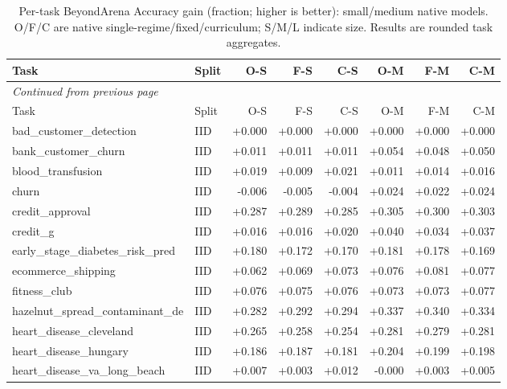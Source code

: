 \begin{longtable}{@{}p{3.95cm}lrrrrrr@{}}
\caption{Per-task BeyondArena Accuracy gain (fraction; higher is better): small/medium native models. O/F/C are native single-regime/fixed/curriculum; S/M/L indicate size. Results are rounded task aggregates.}\label{tab:accsm}\\
\toprule Task & Split & O-S & F-S & C-S & O-M & F-M & C-M\\\midrule
\endfirsthead
\multicolumn{8}{l}{\emph{Continued from previous page}}\\\toprule
Task & Split & O-S & F-S & C-S & O-M & F-M & C-M\\\midrule\endhead
\bottomrule\endfoot
bad\_\allowbreak{}customer\_\allowbreak{}detection & IID & +0.000 & +0.000 & +0.000 & +0.000 & +0.000 & +0.000\\
bank\_\allowbreak{}customer\_\allowbreak{}churn & IID & +0.011 & +0.011 & +0.011 & +0.054 & +0.048 & +0.050\\
blood\_\allowbreak{}transfusion & IID & +0.019 & +0.009 & +0.021 & +0.011 & +0.014 & +0.016\\
churn & IID & -0.006 & -0.005 & -0.004 & +0.024 & +0.022 & +0.024\\
credit\_\allowbreak{}approval & IID & +0.287 & +0.289 & +0.285 & +0.305 & +0.300 & +0.303\\
credit\_\allowbreak{}g & IID & +0.016 & +0.016 & +0.020 & +0.040 & +0.034 & +0.037\\
early\_\allowbreak{}stage\_\allowbreak{}diabetes\_\allowbreak{}risk\_\allowbreak{}pred & IID & +0.180 & +0.172 & +0.170 & +0.181 & +0.178 & +0.169\\
ecommerce\_\allowbreak{}shipping & IID & +0.062 & +0.069 & +0.073 & +0.076 & +0.081 & +0.077\\
fitness\_\allowbreak{}club & IID & +0.076 & +0.075 & +0.076 & +0.073 & +0.073 & +0.077\\
hazelnut\_\allowbreak{}spread\_\allowbreak{}contaminant\_\allowbreak{}de & IID & +0.282 & +0.292 & +0.294 & +0.337 & +0.340 & +0.334\\
heart\_\allowbreak{}disease\_\allowbreak{}cleveland & IID & +0.265 & +0.258 & +0.254 & +0.281 & +0.279 & +0.281\\
heart\_\allowbreak{}disease\_\allowbreak{}hungary & IID & +0.186 & +0.187 & +0.181 & +0.204 & +0.199 & +0.198\\
heart\_\allowbreak{}disease\_\allowbreak{}va\_\allowbreak{}long\_\allowbreak{}beach & IID & +0.007 & +0.003 & +0.012 & -0.000 & +0.003 & +0.005\\

\end{longtable}
